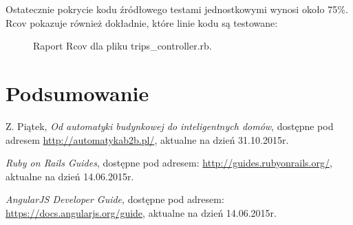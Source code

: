\documentclass[eng,oneside]{mgr}
\begin{document}
Ostatecznie pokrycie kodu źródłowego testami jednostkowymi wynosi około 75\%. Rcov pokazuje również dokładnie, które linie kodu są testowane:
\begin{figure}[h]
	\centering
	\caption{Raport Rcov dla pliku trips\_controller.rb.}
	\label{fig:raport}
\end{figure}
\chapter{Podsumowanie}

\begin{thebibliography}{inteligencja}

	Z. Piątek, \emph{Od automatyki budynkowej do inteligentnych domów}, dostępne pod adresem \url{http://automatykab2b.pl/}, aktualne na dzień 31.10.2015r.
	
	\emph{Ruby on Rails Guides}, dostępne pod adresem: \url{http://guides.rubyonrails.org/},\\ aktualne na dzień 14.06.2015r.
	
	\emph{AngularJS Developer Guide}, dostępne pod adresem: \url{https://docs.angularjs.org/guide}, aktualne na dzień 14.06.2015r.
	
\end{thebibliography}
\end{document}
